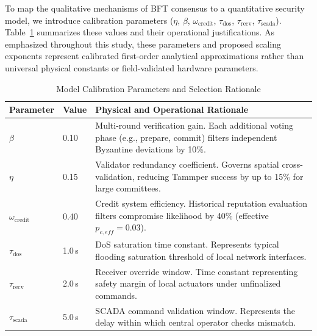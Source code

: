 \documentclass[10pt,twocolumn,journal]{IEEEtran}
\begin{document}
To map the qualitative mechanisms of BFT consensus to a quantitative security model, we introduce calibration parameters ($\eta$, $\beta$, $\omega_{\mathrm{credit}}$, $\tau_{\mathrm{dos}}$, $\tau_{\mathrm{recv}}$, $\tau_{\mathrm{scada}}$). Table~\ref{tab:parameter_selection} summarizes these values and their operational justifications. As emphasized throughout this study, these parameters and proposed scaling exponents represent calibrated first-order analytical approximations rather than universal physical constants or field-validated hardware parameters.

\begin{table}[t]
\caption{Model Calibration Parameters and Selection Rationale}
\label{tab:parameter_selection}
\centering
\scriptsize
\begin{tabular}{@{}llp{4.5cm}@{}}
\toprule
\textbf{Parameter} & \textbf{Value} & \textbf{Physical and Operational Rationale} \\
\midrule
$\beta$ & 0.10 & Multi-round verification gain. Each additional voting phase (e.g., prepare, commit) filters independent Byzantine deviations by 10\%. \\
$\eta$ & 0.15 & Validator redundancy coefficient. Governs spatial cross-validation, reducing Tammper success by up to 15\% for large committees. \\
$\omega_{\mathrm{credit}}$ & 0.40 & Credit system efficiency. Historical reputation evaluation filters compromise likelihood by 40\% (effective $p_{c,eff} = 0.03$). \\
$\tau_{\mathrm{dos}}$ & 1.0\,s & DoS saturation time constant. Represents typical flooding saturation threshold of local network interfaces. \\
$\tau_{\mathrm{recv}}$ & 2.0\,s & Receiver override window. Time constant representing safety margin of local actuators under unfinalized commands. \\
$\tau_{\mathrm{scada}}$ & 5.0\,s & SCADA command validation window. Represents the delay within which central operator checks mismatch. \\
\bottomrule
\end{tabular}
\end{table}
\end{document}
